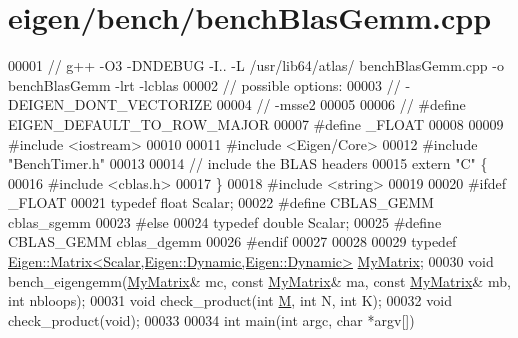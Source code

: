 \hypertarget{eigen_2bench_2bench_blas_gemm_8cpp_source}{}\section{eigen/bench/bench\+Blas\+Gemm.cpp}
\label{eigen_2bench_2bench_blas_gemm_8cpp_source}

\begin{DoxyCode}
00001 \textcolor{comment}{// g++ -O3 -DNDEBUG -I.. -L /usr/lib64/atlas/ benchBlasGemm.cpp -o benchBlasGemm -lrt -lcblas}
00002 \textcolor{comment}{// possible options:}
00003 \textcolor{comment}{//    -DEIGEN\_DONT\_VECTORIZE}
00004 \textcolor{comment}{//    -msse2}
00005 
00006 \textcolor{comment}{// #define EIGEN\_DEFAULT\_TO\_ROW\_MAJOR}
00007 \textcolor{preprocessor}{#define \_FLOAT}
00008 
00009 \textcolor{preprocessor}{#include <iostream>}
00010 
00011 \textcolor{preprocessor}{#include <Eigen/Core>}
00012 \textcolor{preprocessor}{#include "BenchTimer.h"}
00013 
00014 \textcolor{comment}{// include the BLAS headers}
00015 \textcolor{keyword}{extern} \textcolor{stringliteral}{"C"} \{
00016 \textcolor{preprocessor}{#include <cblas.h>}
00017 \}
00018 \textcolor{preprocessor}{#include <string>}
00019 
00020 \textcolor{preprocessor}{#ifdef \_FLOAT}
00021 \textcolor{keyword}{typedef} \textcolor{keywordtype}{float} Scalar;
00022 \textcolor{preprocessor}{#define CBLAS\_GEMM cblas\_sgemm}
00023 \textcolor{preprocessor}{#else}
00024 \textcolor{keyword}{typedef} \textcolor{keywordtype}{double} Scalar;
00025 \textcolor{preprocessor}{#define CBLAS\_GEMM cblas\_dgemm}
00026 \textcolor{preprocessor}{#endif}
00027 
00028 
00029 \textcolor{keyword}{typedef} \hyperlink{group___core___module_class_eigen_1_1_matrix}{Eigen::Matrix<Scalar,Eigen::Dynamic,Eigen::Dynamic>}
       \hyperlink{group___core___module_class_eigen_1_1_matrix}{MyMatrix};
00030 \textcolor{keywordtype}{void} bench\_eigengemm(\hyperlink{group___core___module_class_eigen_1_1_matrix}{MyMatrix}& mc, \textcolor{keyword}{const} \hyperlink{group___core___module_class_eigen_1_1_matrix}{MyMatrix}& ma, \textcolor{keyword}{const} 
      \hyperlink{group___core___module_class_eigen_1_1_matrix}{MyMatrix}& mb, \textcolor{keywordtype}{int} nbloops);
00031 \textcolor{keywordtype}{void} check\_product(\textcolor{keywordtype}{int} \hyperlink{group___core___module_class_eigen_1_1_matrix}{M}, \textcolor{keywordtype}{int} N, \textcolor{keywordtype}{int} K);
00032 \textcolor{keywordtype}{void} check\_product(\textcolor{keywordtype}{void});
00033 
00034 \textcolor{keywordtype}{int} main(\textcolor{keywordtype}{int} argc, \textcolor{keywordtype}{char} *argv[])

\end{DoxyCode}
